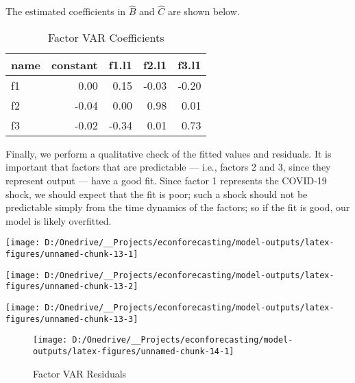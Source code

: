 \documentclass[11pt, letterpaper]{article}\usepackage[]{graphicx}\usepackage[]{color}
\begin{document}
The estimated coefficients in $\widehat{B}$ and $\widehat{C}$ are shown below.
\begin{table}[H]
\centering
\begingroup\footnotesize
\begin{tabular}{lrrrr}
  \hline
name & constant & f1.l1 & f2.l1 & f3.l1 \\ 
  \hline
f1 & 0.00 & 0.15 & -0.03 & -0.20 \\ 
  f2 & -0.04 & 0.00 & 0.98 & 0.01 \\ 
  f3 & -0.02 & -0.34 & 0.01 & 0.73 \\ 
   \hline
\end{tabular}
\endgroup
\caption{Factor VAR Coefficients} 
\end{table}



Finally, we perform a qualitative check of the fitted values and residuals. It is important that factors that are predictable --- i.e., factors 2 and 3, since they represent output --- have a good fit. Since factor 1 represents the COVID-19 shock, we should expect that the fit is poor; such a shock should not be predictable simply from the time dynamics of the factors; so if the fit is good, our model is likely overfitted.


{\centering \texttt{[image: D:/Onedrive/\_\_Projects/econforecasting/model-outputs/latex-figures/unnamed-chunk-13-1]} 

}




{\centering \texttt{[image: D:/Onedrive/\_\_Projects/econforecasting/model-outputs/latex-figures/unnamed-chunk-13-2]} 

}




{\centering \texttt{[image: D:/Onedrive/\_\_Projects/econforecasting/model-outputs/latex-figures/unnamed-chunk-13-3]} 

}





\begin{figure}[H]

{\centering \texttt{[image: D:/Onedrive/\_\_Projects/econforecasting/model-outputs/latex-figures/unnamed-chunk-14-1]} 

}

\caption[Factor VAR Residuals]{Factor VAR Residuals}\label{fig:unnamed-chunk-14}
\end{figure}
\end{document}
